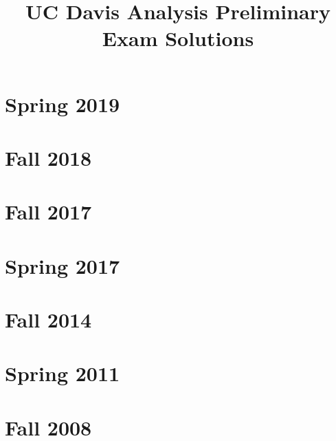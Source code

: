 \documentclass{book}
\title{UC Davis Analysis Preliminary Exam Solutions}
\begin{document}
\maketitle

\chapter{Spring 2019}


\chapter{Fall 2018}


\chapter{Fall 2017}



\chapter{Spring 2017}


\chapter{Fall 2014}


\chapter{Spring 2011}


\chapter{Fall 2008}

\end{document}
